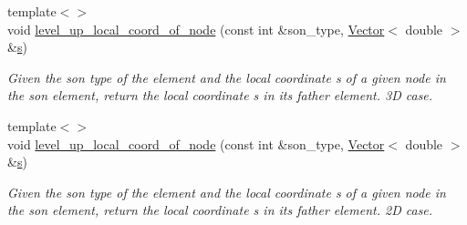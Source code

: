 \begin{DoxyCompactItemize}
{\footnotesize template$<$$>$ }\\void \hyperlink{classoomph_1_1HelmholtzMGPreconditioner_aa3b4679e9615fdcaf6516414c015b816}{level\+\_\+up\+\_\+local\+\_\+coord\+\_\+of\+\_\+node} (const int \&son\+\_\+type, \hyperlink{classoomph_1_1Vector}{Vector}$<$ double $>$ \&\hyperlink{cfortran_8h_ab7123126e4885ef647dd9c6e3807a21c}{s})
\begin{DoxyCompactList}\small\item\em Given the son type of the element and the local coordinate s of a given node in the son element, return the local coordinate s in its father element. 3D case. \end{DoxyCompactList}\item 
{\footnotesize template$<$$>$ }\\void \hyperlink{classoomph_1_1HelmholtzMGPreconditioner_af2ea46ead16d2e6940cb72963e78efc5}{level\+\_\+up\+\_\+local\+\_\+coord\+\_\+of\+\_\+node} (const int \&son\+\_\+type, \hyperlink{classoomph_1_1Vector}{Vector}$<$ double $>$ \&\hyperlink{cfortran_8h_ab7123126e4885ef647dd9c6e3807a21c}{s})
\begin{DoxyCompactList}\small\item\em Given the son type of the element and the local coordinate s of a given node in the son element, return the local coordinate s in its father element. 2D case. \end{DoxyCompactList}\end{DoxyCompactItemize}
